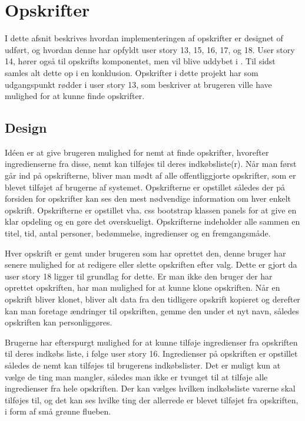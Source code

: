 \section{Opskrifter}
I dette afsnit beskrives hvordan implementeringen af opskrifter er designet of udført, og hvordan denne har opfyldt user story 13, 15, 16, 17, og 18. User story 14, hører også til opskrifts komponentet, men vil blive uddybet i . Til sidst samles alt dette op i en konklusion. Opskrifter i dette projekt har som udgangspunkt rødder i user story 13, som beskriver at brugeren ville have mulighed for at kunne finde opskrifter.
\subsection{Design}
Idéen er at give brugeren mulighed for nemt at finde opskrifter, hvorefter ingredienserne fra disse, nemt kan tilføjes til deres indkøbsliste(r).
Når man først går ind på opskrifterne, bliver man mødt af alle offentliggjorte opskrifter, som er blevet tilføjet af brugerne af systemet.
Opskrifterne er opstillet således der på forsiden for opskrifter kan ses den mest nødvendige information om hver enkelt opskrift.
Opskrifterne er opstillet vha. css bootstrap klassen panels for at give en klar opdeling og en gøre det overskueligt.
Opskrifterne indeholder alle sammen en titel, tid, antal personer, bedømmelse, ingredienser og en fremgangsmåde.

Hver opskrift er gemt under brugeren som har oprettet den, denne bruger har senere mulighed for at redigere eller slette opskriften efter valg.
Dette er gjort da user story 18 ligger til grundlag for dette.
Er man ikke den bruger der har oprettet opskriften, har man mulighed for at kunne klone opskriften.
Når en opskrift bliver klonet, bliver alt data fra den tidligere opskrift kopieret og derefter kan man foretage ændringer til opskriften, gemme den under et nyt navn, således opskriften kan personliggøres.

Brugerne har efterspurgt mulighed for at kunne tilføje ingredienser fra opskriften til deres indkøbs liste, i følge user story 16.
Ingredienser på opskriften er opstillet således de nemt kan tilføjes til brugerens indkøbslister.
Det er muligt kun at vælge de ting man mangler, således man ikke er tvunget til at tilføje alle ingredienser fra hele opskriften.
Der kan vælges hvilken indkøbsliste varerne skal tilføjes til, og det kan ses hvilke ting der allerrede er blevet tilføjet fra opskriften, i form af små grønne flueben.


